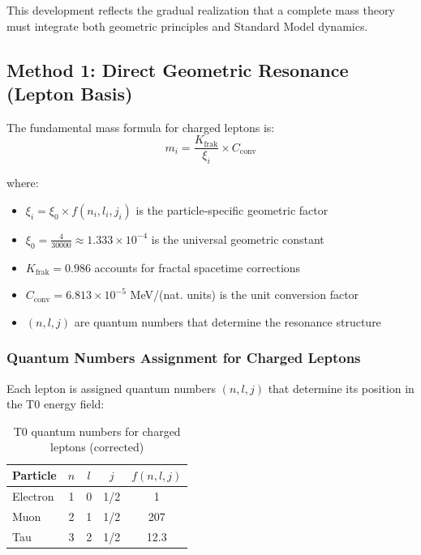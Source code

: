 	This development reflects the gradual realization that a complete mass theory must integrate both geometric principles and Standard Model dynamics.
	
	\subsection{Method 1: Direct Geometric Resonance (Lepton Basis)}
	
	The fundamental mass formula for charged leptons is:
	\begin{equation}
		\boxed{m_i = \frac{K_{\text{frak}}}{\xi_i} \times C_{\text{conv}}}
		\label{eq:t0_direct_mass}
	\end{equation}
	
	where:
	\begin{itemize}
		\item $\xi_i = \xi_0 \times f(n_i, l_i, j_i)$ is the particle-specific geometric factor
		\item $\xi_0 = \frac{4}{30000} \approx 1.333 \times 10^{-4}$ is the universal geometric constant
		\item $K_{\text{frak}} = 0.986$ accounts for fractal spacetime corrections
		\item $C_{\text{conv}} = 6.813 \times 10^{-5}$ MeV/(nat. units) is the unit conversion factor
		\item $(n, l, j)$ are quantum numbers that determine the resonance structure
	\end{itemize}
	
	\subsubsection{Quantum Numbers Assignment for Charged Leptons}
	
	Each lepton is assigned quantum numbers $(n, l, j)$ that determine its position in the T0 energy field:
	
	\begin{table}[h]
		\centering
		\begin{tabular}{lcccc}
			\toprule
			\textbf{Particle} & \textbf{$n$} & \textbf{$l$} & \textbf{$j$} & \textbf{$f(n,l,j)$} \\
			\midrule
			Electron & 1 & 0 & 1/2 & 1 \\
			Muon & 2 & 1 & 1/2 & 207 \\
			Tau & 3 & 2 & 1/2 & 12.3 \\
			\bottomrule
		\end{tabular}
		\caption{T0 quantum numbers for charged leptons (corrected)}
		\label{tab:lepton_qn_direkt}
	\end{table}

